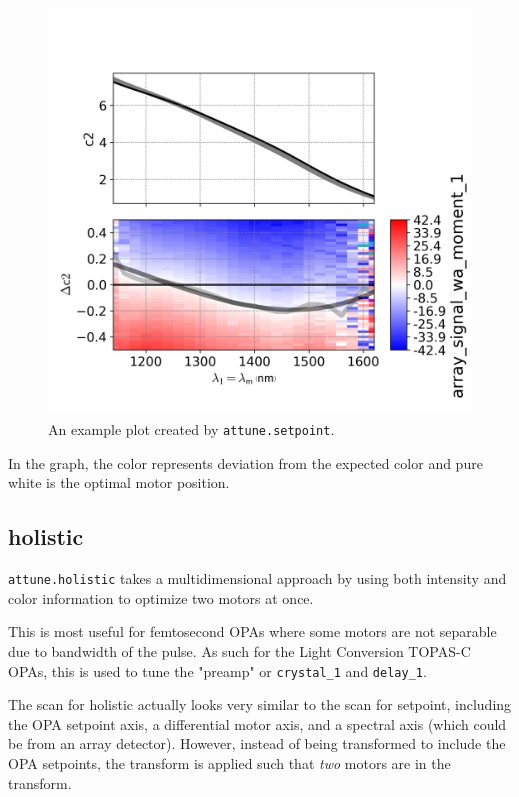 \begin{figure}
\includegraphics{representation/images/setpoint.png}
\caption[Setpoint]{
	An example plot created by \texttt{attune.setpoint}.
}
\label{rep:fig:setpoint}
\end{figure}

In the graph, the color represents deviation from the expected color and
pure white is the optimal motor position.

\hypertarget{holistic}{%
\subsection{holistic}\label{holistic}}

\texttt{attune.holistic} takes a multidimensional
approach by using both intensity and color information to optimize two
motors at once.

This is most useful for femtosecond OPAs where some motors are not
separable due to bandwidth of the pulse. As such for the Light
Conversion TOPAS-C OPAs, this is used to tune the "preamp" or
\texttt{crystal\_1} and \texttt{delay\_1}.

The scan for holistic actually looks very similar to the scan for
setpoint, including the OPA setpoint axis, a differential motor axis,
and a spectral axis (which could be from an array detector). However,
instead of being transformed to include the OPA setpoints, the transform
is applied such that \emph{two} motors are in the transform.

